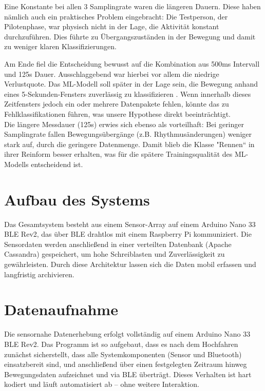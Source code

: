 Eine Konstante bei allen 3 Samplingrate waren die längeren Dauern. Diese haben nämlich auch ein praktisches Problem eingebracht: Die Testperson, der Pilotenphase, war physisch nicht in der Lage, die Aktivität konstant durchzuführen. Dies führte zu Übergangszuständen in der Bewegung und damit zu weniger klaren Klassifizierungen.

Am Ende fiel die Entscheidung bewusst auf die Kombination aus 500ms Intervall und 125s Dauer. Ausschlaggebend war hierbei vor allem die niedrige Verlustquote. Das \ac{ML}-Modell soll später in der Lage sein, die Bewegung anhand eines 5-Sekunden-Fensters zuverlässig zu klassifizieren \cite{jsss-13-187-2024}. Wenn innerhalb dieses Zeitfensters jedoch ein oder mehrere Datenpakete fehlen, könnte das zu Fehlklassifikationen führen, was unsere Hypothese direkt beeinträchtigt.\\

Die längere Messdauer (125s) erwies sich ebenso als vorteilhaft: Bei geringer Samplingrate fallen Bewegungsübergänge (z.B. Rhythmusänderungen) weniger stark auf, durch die geringere Datenmenge. Damit blieb die Klasse "Rennen“ in ihrer Reinform besser erhalten, was für die spätere Trainingsqualität des ML-Modells entscheidend ist.

\section{Aufbau des Systems}

Das Gesamtsystem besteht aus einem Sensor-Array auf einem Arduino Nano 33 BLE Rev2, das über BLE drahtlos mit einem Raspberry Pi kommuniziert. Die Sensordaten werden anschließend in einer verteilten Datenbank (Apache Cassandra) gespeichert, um hohe Schreiblasten und Zuverlässigkeit zu gewährleisten. Durch diese Architektur lassen sich die Daten mobil erfassen und langfristig archivieren.

\section{Datenaufnahme}

Die sensornahe Datenerhebung erfolgt vollständig auf einem Arduino Nano 33 BLE Rev2. Das Programm ist so aufgebaut, dass es nach dem Hochfahren zunächst sicherstellt, dass alle Systemkomponenten (Sensor und Bluetooth) einsatzbereit sind, und anschließend über einen festgelegten Zeitraum hinweg Bewegungsdaten aufzeichnet und via BLE überträgt. Dieses Verhalten ist hart kodiert und läuft automatisiert ab – ohne weitere Interaktion.

